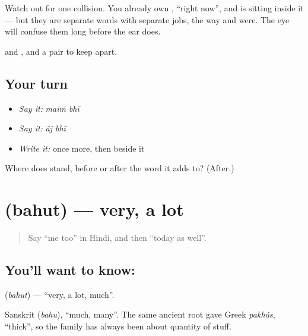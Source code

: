 Watch out for one collision. You already own \textbf{}, \textquotedblleft{}right now\textquotedblright{}, and  is sitting inside it — but they are separate words with separate jobs, the way \textbf{} and \textbf{} were. The eye will confuse them long before the ear does.

\begin{grammarlens}[title={What you've built}]
 and , and a pair to keep apart.
\end{grammarlens}

\subsection*{Your turn}
\begin{itemize}
\raggedright
  \item \emph{Say it:} \emph{maiṁ bhī}
  \item \emph{Say it:} \emph{āj bhī}
  \item \emph{Write it:}  once more, then  beside it
\end{itemize}

\begin{tcolorbox}[breakable,colback=teal!4,colframe=teal!35!black,title={Before you move on}]
Where does  stand, before or after the word it adds to? (After.)
\end{tcolorbox}
\section[bahut]{ (bahut) — very, a lot}

\label{lesson:HI-C71-very}



\begin{quote}
Say \textquotedblleft{}me too\textquotedblright{} in Hindi, and then \textquotedblleft{}today as well\textquotedblright{}.
\end{quote}

\subsection*{You'll want to know: }
\textbf{} (\emph{bahut}) — \textquotedblleft{}very, a lot, much\textquotedblright{}.

Sanskrit  (\emph{bahu}), \textquotedblleft{}much, many\textquotedblright{}. The same ancient root gave Greek \emph{pakhús}, \textquotedblleft{}thick\textquotedblright{}, so the family has always been about quantity of stuff.

